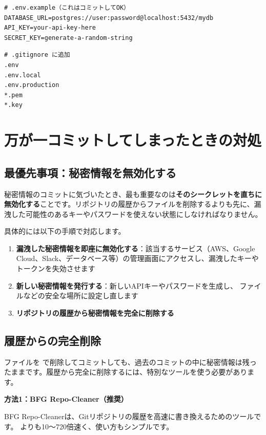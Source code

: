\begin{lstlisting}[language={}]
# .env.example（これはコミットしてOK）
DATABASE_URL=postgres://user:password@localhost:5432/mydb
API_KEY=your-api-key-here
SECRET_KEY=generate-a-random-string
\end{lstlisting}

\begin{lstlisting}[language={}]
# .gitignore に追加
.env
.env.local
.env.production
*.pem
*.key
\end{lstlisting}

\section{万が一コミットしてしまったときの対処}

\subsection{最優先事項：秘密情報を無効化する}

秘密情報のコミットに気づいたとき、最も重要なのは\textbf{そのシークレットを直ちに無効化する}ことです。リポジトリの履歴からファイルを削除するよりも先に、漏洩した可能性のあるキーやパスワードを使えない状態にしなければなりません。

具体的には以下の手順で対応します。

\begin{enumerate}
  \item \textbf{漏洩した秘密情報を即座に無効化する}：該当するサービス（AWS、Google Cloud、Slack、データベース等）の管理画面にアクセスし、漏洩したキーやトークンを失効させます
  \item \textbf{新しい秘密情報を発行する}：新しいAPIキーやパスワードを生成し、 ファイルなどの安全な場所に設定し直します
  \item \textbf{リポジトリの履歴から秘密情報を完全に削除する}
\end{enumerate}

\subsection{履歴からの完全削除}

ファイルを  で削除してコミットしても、過去のコミットの中に秘密情報は残ったままです。履歴から完全に削除するには、特別なツールを使う必要があります。

\textbf{方法1：BFG Repo-Cleaner（推奨）}

BFG Repo-Cleanerは、Gitリポジトリの履歴を高速に書き換えるためのツールです。 よりも10〜720倍速く、使い方もシンプルです。

